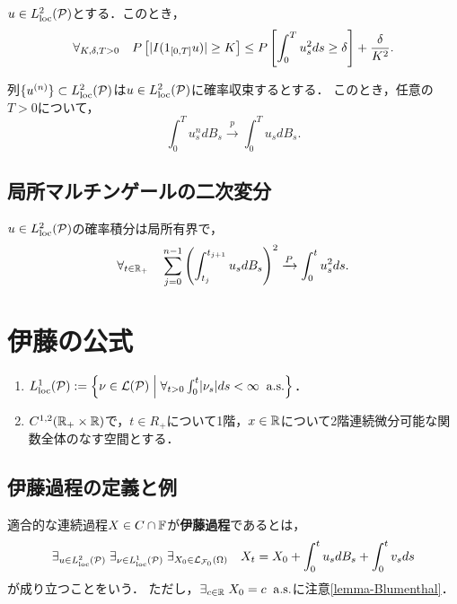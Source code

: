\documentclass[uplatex,dvipdfmx]{jsreport}
\begin{document}
\begin{proposition}
    $u\in L^2_{\mathrm{loc}}(\mathcal{P})$とする．このとき，
    \[\forall_{K,\delta,T>0}\quad P\left[\lvert I(1_{[0,T]}u)\rvert\ge K\right]\le P\left[\int^T_0u_s^2ds\ge\delta\right]+\frac{\delta}{K^2}.\]
\end{proposition}

\begin{corollary}
    列$\{u^{(n)}\}\subset L^2_{\mathrm{loc}}(\mathcal{P})$は$u\in L^2_{\mathrm{loc}}(\mathcal{P})$に確率収束するとする．
    このとき，任意の$T>0$について，
    \[\int^T_0u^n_sdB_s\xrightarrow{p}\int^T_0u_sdB_s.\]
\end{corollary}

\subsection{局所マルチンゲールの二次変分}

\begin{proposition}
    $u\in L^2_{\mathrm{loc}}(\mathcal{P})$の確率積分は局所有界で，
    \[\forall_{t\in\mathbb{R}_+}\quad\sum^{n-1}_{j=0}\left(\int^{t_{j+1}}_{t_j}u_sdB_s\right)^2\xrightarrow{P}\int^t_0u_s^2ds.\]
\end{proposition}

\section{伊藤の公式}

\begin{notation}\mbox{}
    \begin{enumerate}
        \item $L^1_{\mathrm{loc}}(\mathcal{P}):=\left\{\nu\in\mathcal{L}(\mathcal{P})\;\middle|\;\forall_{t>0}\int^t_0\lvert\nu_s\rvert ds<\infty\;\;\mathrm{a.s.}\right\}$．
        \item $C^{1,2}(\mathbb{R}_+\times\mathbb{R})$で，$t\in R_+$について1階，$x\in \mathbb{R}$について2階連続微分可能な関数全体のなす空間とする．
    \end{enumerate}
\end{notation}

\subsection{伊藤過程の定義と例}

\begin{definition}
    適合的な連続過程$X\in C\cap\mathbb{F}$が\textbf{伊藤過程}であるとは，
    \[\exists_{u\in L^2_{\mathrm{loc}}(\mathcal{P})}\;\exists_{\nu\in L^1_{\mathrm{loc}}(\mathcal{P})}\;\exists_{X_0\in\mathcal{L}_{\mathcal{F}_0}(\Omega)}\quad X_t=X_0+\int^t_0u_sdB_s+\int^t_0v_sds\]
    が成り立つことをいう．
    ただし，$\exists_{c\in\mathbb{R}}\;X_0=c\;\;\mathrm{a.s.}$に注意\ref{lemma-Blumenthal}．
\end{definition}
\end{document}
